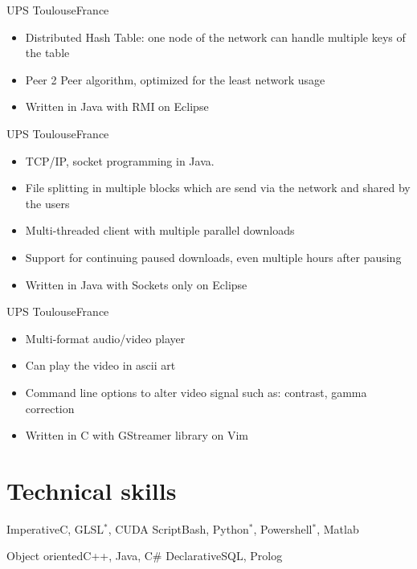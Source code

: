 \documentclass[a4paper,11pt]{moderncv}
\begin{document}
{UPS Toulouse}{France}
{
    \begin{itemize}
        \item Distributed Hash Table: one node of the network can handle multiple keys of the table
        \item Peer 2 Peer algorithm, optimized for the least network usage
        \item Written in Java with RMI on Eclipse
    \end{itemize}
}

{UPS Toulouse}{France}
{
    \begin{itemize}
        \item TCP/IP, socket programming in Java.
        \item File splitting in multiple blocks which are send via the network and shared by the users
        \item Multi-threaded client with multiple parallel downloads
        \item Support for continuing paused downloads, even multiple hours after pausing
        \item Written in Java with Sockets only on Eclipse
    \end{itemize}
}

{UPS Toulouse}{France}
{
    \begin{itemize}
        \item Multi-format audio/video player
        \item Can play the video in ascii art
        \item Command line options to alter video signal such as: contrast, gamma correction
        \item Written in C with GStreamer library on Vim
    \end{itemize}
}

\section{Technical skills}
\cvdoubleitem
{Imperative}{C, GLSL$^*$, CUDA}
{Script}{Bash, Python$^*$, Powershell$^*$, Matlab}

\cvdoubleitem
{Object oriented}{C++, Java, C\#}
{Declarative}{SQL, Prolog}
\end{document}
